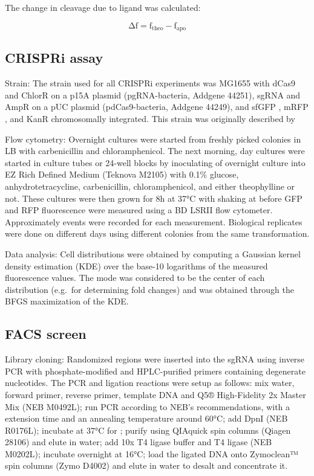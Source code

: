 \documentclass[10pt,oneside]{article}
\begin{document}
The change in cleavage due to ligand was calculated: 

\begin{displaymath}
 \mathrm{Δf} = \mathrm{f}_\mathrm{theo} - \mathrm{f}_\mathrm{apo}
\end{displaymath}

\subsection{CRISPRi assay}

Strain: The strain used for all CRISPRi experiments was \ecoli{} MG1655 with dCas9 and ChlorR on a p15A plasmid (pgRNA-bacteria, Addgene 44251), sgRNA and AmpR on a pUC plasmid (pdCas9-bacteria, Addgene 44249), and sfGFP \autocite{pedelacq2006}, mRFP \autocite{campbell2002}, and KanR chromosomally integrated.  This strain was originally described by 

Flow cytometry: Overnight cultures were started from freshly picked colonies in  LB with  carbenicillin and  chloramphenicol.  The next morning, day cultures were started in  culture tubes or 24-well blocks by inoculating  of overnight culture into  EZ Rich Defined Medium (Teknova M2105) with 0.1\% glucose,  an\-hydro\-tetra\-cycline,  carbenicillin,  chloramphenicol, and either  theophylline or not.  These cultures were then grown for 8h at 37°C with shaking at  before GFP and RFP fluorescence were measured using a BD LSRII flow cytometer.  Approximately \unit[10,000]{events} were recorded for each measurement.  Biological replicates were done on different days using different colonies from the same transformation.

Data analysis: Cell distributions were obtained by computing a Gaussian kernel density estimation (KDE) over the base-10 logarithms of the measured fluorescence values.  The mode was considered to be the center of each distribution (e.g.\ for determining fold changes) and was obtained through the BFGS maximization of the KDE.

\subsection{FACS screen}

Library cloning: Randomized regions were inserted into the sgRNA using inverse PCR with phosphate-modified and HPLC-purified primers containing degenerate nucleotides.  The PCR and ligation reactions were setup as follows: mix  water,   forward primer,   reverse primer,   template DNA and  Q5® High-Fidelity 2x Master Mix (NEB M0492L); run PCR according to NEB's recommendations, with a  extension time and an annealing temperature around 60°C; add   DpnI (NEB R0176L); incubate at 37°C for ; purify using QIAquick spin columns (Qiagen 28106) and elute in  water; add  10x T4 ligase buffer and   T4 ligase (NEB M0202L); incubate overnight at 16°C; load the ligated DNA onto Zymoclean™ spin columns (Zymo D4002) and elute in  water to desalt and concentrate it.
\end{document}
